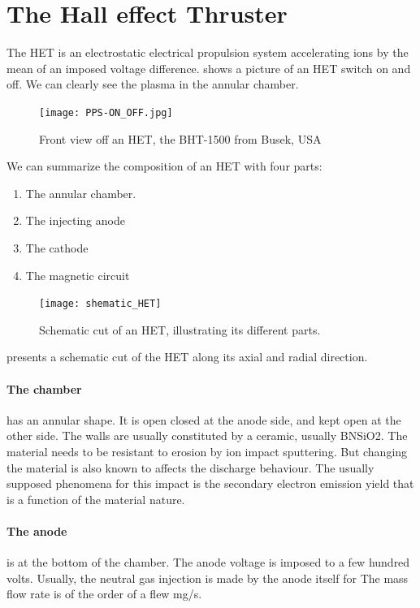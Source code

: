 

\section{The Hall effect Thruster }
\label{sec-HET}

The \ac{HET} is an electrostatic electrical propulsion system accelerating ions by the mean of an imposed voltage difference.
 shows a picture of an \ac{HET} switch on and off.
We can clearly see the plasma in the annular chamber.


\begin{figure}[hbtp]
  \centering
  \texttt{[image: PPS-ON\_OFF.jpg]}
  \caption{Front view off an \ac{HET}, the BHT-1500 from Busek, USA}
  \label{fig-bhtonoff}
\end{figure}

We can summarize the composition of an \ac{HET} with four parts:
\begin{enumerate}
  \item The annular chamber.
  \item The injecting anode
  \item The cathode
  \item The magnetic circuit
\end{enumerate}

\begin{figure}[hbtp]
  \centering
  \texttt{[image: shematic\_HET]}
  \caption{Schematic cut of an \ac{HET}, illustrating its different parts. }
  \label{fig-shematiccut}
\end{figure}

 presents a schematic cut of the \ac{HET} along its axial and radial direction.

\paragraph{The chamber} has an annular shape.
It is open closed at the anode side, and kept open at the other side.
The walls are usually constituted by a ceramic, usually \ac{BNSiO2}.
The material needs to be resistant to erosion by ion impact sputtering.
But changing the material is also known to affects the discharge behaviour.
The usually supposed phenomena for this impact is the secondary electron emission yield that is a function of the material nature.


\paragraph{The anode} is at the bottom of the chamber.
The anode voltage is imposed to a few hundred volts.
Usually, the neutral gas injection is made by the anode itself for
The mass flow rate is of the order of a flew mg/s.

